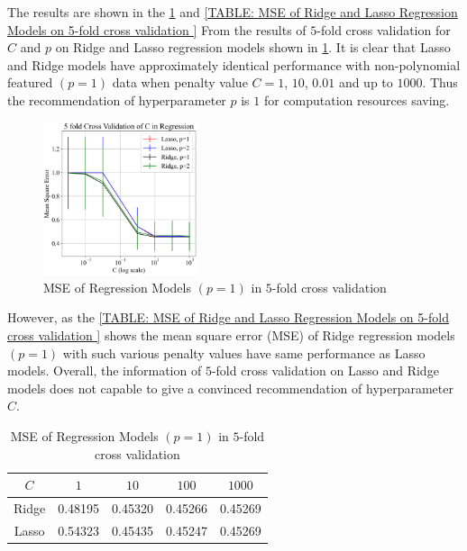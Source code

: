 The results are shown in the \ref{FIGURES: Lasso, Ridge, Cross Validation}
and \ref{TABLE: MSE of Ridge and Lasso Regression Models on 5-fold cross validation }
From the results of $5$-fold cross validation for $C$ and $p$ on Ridge and Lasso regression 
models shown in  
\ref{FIGURES: Lasso, Ridge, Cross Validation}. 
It is clear that Lasso and Ridge models have approximately identical 
performance with non-polynomial featured $(p=1)$ data when penalty 
value $C = 1$, $10$, $0.01$ and up to $1000$.  
Thus the recommendation of hyperparameter $p$ is $1$
for computation resources saving. 
\begin{figure}[H]
    \centering
    \includegraphics[width=0.4\textwidth]{chap/fig1.png}
    \caption{
        \footnotesize
        MSE of Regression Models $(p=1)$ in
        $5$-fold cross validation
        } %
    \label{FIGURES: Lasso, Ridge, Cross Validation}
\end{figure}
However, as the \ref{TABLE: MSE of Ridge and Lasso Regression Models on 5-fold cross validation } shows the mean square error (MSE) of Ridge regression models $(p=1)$
with such various penalty values have same performance as Lasso models. 
Overall, the information of $5$-fold cross validation on Lasso and Ridge models 
does not capable to give a convinced recommendation of hyperparameter $C$.
\begin{table}[H]
    \footnotesize
    \centering
        \caption{
            \footnotesize
        MSE of Regression Models $(p=1)$ in
        $5$-fold cross validation
        } %
    \begin{tabular}{ccccc} %
        \toprule %
        $C$ & $1$ & $10$ & $100$ & $1000$ \\ %
        \midrule %
        Ridge & 0.48195 & 0.45320 & 0.45266 & 0.45269 \\ %
        Lasso & 0.54323 & 0.45435 & 0.45247 & 0.45269 \\ %
        \bottomrule %
    \end{tabular}
    \label{TABLE: 
        MSE of Ridge and Lasso 
        Regression Models on 
        5-fold cross validation    
    } %
\end{table}


